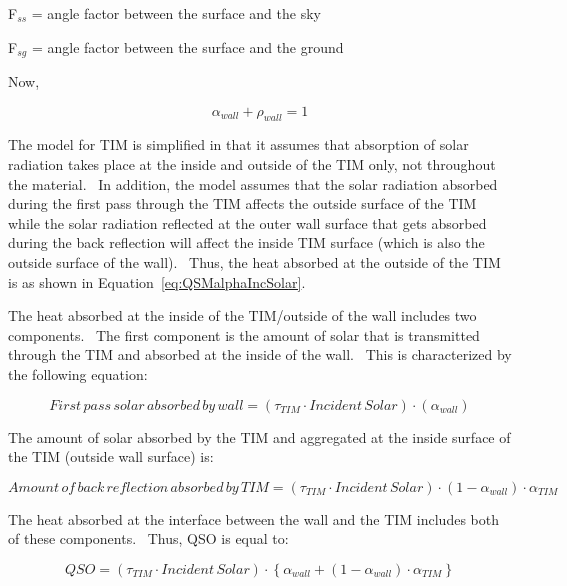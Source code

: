 F\(_{ss}\) = angle factor between the surface and the sky

F\(_{sg}\) = angle factor between the surface and the ground

Now,

\begin{equation}
{\alpha_{wall}} + {\rho_{wall}} = 1
\end{equation}

The model for TIM is simplified in that it assumes that absorption of solar radiation takes place at the inside and outside of the TIM only, not throughout the material.~ In addition, the model assumes that the solar radiation absorbed during the first pass through the TIM affects the outside surface of the TIM while the solar radiation reflected at the outer wall surface that gets absorbed during the back reflection will affect the inside TIM surface (which is also the outside surface of the wall).~ Thus, the heat absorbed at the outside of the TIM is as shown in Equation~\ref{eq:QSMalphaIncSolar}.

The heat absorbed at the inside of the TIM/outside of the wall includes two components.~ The first component is the amount of solar that is transmitted through the TIM and absorbed at the inside of the wall.~ This is characterized by the following equation:

\begin{equation}
First\,pass\,solar\,absorbed\,by\,wall = \left( {{\tau_{TIM}}\cdot Incident\,Solar} \right)\cdot \left( {{\alpha_{wall}}} \right)
\end{equation}

The amount of solar absorbed by the TIM and aggregated at the inside surface of the TIM (outside wall surface) is:

\begin{equation}
Amount\,of\,back\,reflection\,absorbed\,by\,TIM = \left( {{\tau_{TIM}}\cdot Incident\,Solar} \right)\cdot \left( {1 - {\alpha_{wall}}} \right)\cdot {\alpha_{TIM}}
\end{equation}

The heat absorbed at the interface between the wall and the TIM includes both of these components.~ Thus, QSO is equal to:

\begin{equation}
QSO = \left( {{\tau_{TIM}}\cdot Incident\,Solar} \right)\cdot \left\{ {{\alpha_{wall}} + \left( {1 - {\alpha_{wall}}} \right)\cdot \alpha {}_{TIM}} \right\}
\end{equation}

